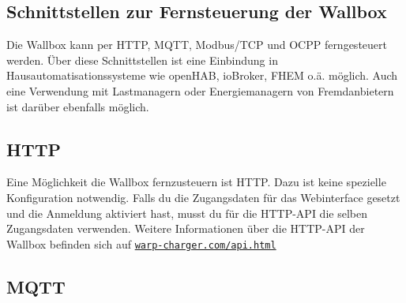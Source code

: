\documentclass[a4paper,10pt]{article}
\newcommand\rurl[2]{%
  \href{#1}{\nolinkurl{#2}}%
}
\begin{document}
\begin{multicols*}{2}
	\newpage
	\null
	\newpage

	\section{Schnittstellen zur Fernsteuerung der Wallbox}\label{interfaces}
	Die Wallbox kann per HTTP, MQTT, Modbus/TCP und OCPP ferngesteuert werden. Über diese Schnittstellen ist eine
	Einbindung in Hausautomatisationssysteme wie openHAB, ioBroker, FHEM o.ä.
	möglich. Auch eine Verwendung mit Lastmanagern oder Energiemanagern von Fremdanbietern
	ist darüber ebenfalls möglich.

	\subsection{HTTP}\label{http-interface}
	Eine Möglichkeit die Wallbox fernzusteuern ist HTTP. Dazu ist keine
	spezielle Konfiguration notwendig. Falls du die Zugangsdaten für das Webinterface gesetzt und die Anmeldung aktiviert hast, musst du
	für die HTTP-API die selben Zugangsdaten verwenden.
	Weitere Informationen über die HTTP-API der Wallbox befinden sich auf \rurl{https://warp-charger.com/api.html}{warp-charger.com/api.html}


	\subsection{MQTT}\label{mqtt-interface}


\end{multicols*}
\end{document}
